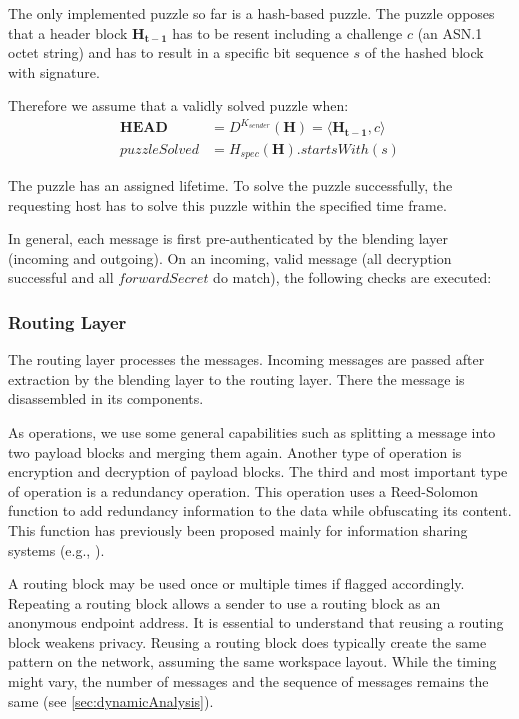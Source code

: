 \documentclass[acmsmall, screen]{acmart}
\begin{document}
The only implemented puzzle so far is a hash-based puzzle. The puzzle opposes that a header block $\mathbf{H_{t-1}}$ has to be resent including a challenge $c$ (an ASN.1 octet string) and has to result in a specific bit sequence $s$ of the hashed block with signature.

Therefore we assume that a validly solved puzzle when:
\begin{eqnarray}
\mathbf{HEAD}&= D^{K_{sender}}\left(\mathbf{H}\right) = \langle \mathbf{H_{t-1}}, c\rangle\\
puzzleSolved&= H_{spec}(\mathbf{H}).startsWith(s)
\end{eqnarray}

The puzzle has an assigned lifetime. To solve the puzzle successfully, the requesting host has to solve this puzzle within the specified time frame. 

In general, each message is first pre-authenticated by the blending layer (incoming and outgoing). On an incoming, valid message (all decryption successful and all $forwardSecret$ do match), the following checks are executed:

\subsubsection{Routing Layer}
The routing layer processes the messages. Incoming messages are passed after extraction by the blending layer to the routing layer. There the message is disassembled in its components.

As operations, we use some general capabilities such as splitting a message into two payload blocks and merging them again. Another type of operation is encryption and decryption of payload blocks. The third and most important type of operation is a redundancy operation. This operation uses a Reed-Solomon\cite{reed1960polynomial} function to add redundancy information to the data while obfuscating its content. This function has previously been proposed mainly for information sharing systems (e.g., \cite{mceliece1981sharing}).

A routing block may be used once or multiple times if flagged accordingly. Repeating a routing block allows a sender to use a routing block as an anonymous endpoint address. It is essential to understand that reusing a routing block weakens privacy. Reusing a routing block does typically create the same pattern on the network, assuming the same workspace layout. While the timing might vary, the number of messages and the sequence of messages remains the same (see \ref{sec:dynamicAnalysis}).
\end{document}
